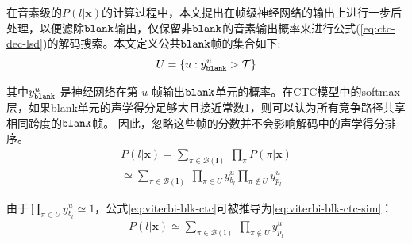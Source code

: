 在音素级的$P(l|\mathbf{x})$的计算过程中，本文提出在帧级神经网络的输出上进行一步后处理，以便滤除$\tt blank$输出，仅保留非$\tt blank$的音素输出概率来进行公式(\ref{eq:ctc-dec-lsd})的解码搜索。本文定义公共$\tt blank$帧的集合如下:
  \begin{equation} \label{eq:com-blk-idx}
    U=\{u:y^{u}_{\tt{blank}} > \mathcal{T}\}
    \end{equation}


其中$y^{u}_{\tt{blank}}$ 是神经网络在第 $u$ 帧输出$\tt blank$单元的概率。在CTC模型中的softmax层，如果blank单元的声学得分足够大且接近常数1，则可以认为所有竞争路径共享相同跨度的$\tt blank$帧。 因此，忽略这些帧的分数并不会影响解码中的声学得分排序。
  \begin{equation} \label{eq:viterbi-blk-ctc}
  \begin{split}
      P(l|\mathbf{x})
      =\sum_{\pi\in\mathcal{B}(\mathbf{l})}
          \ \prod_{\pi}P(\pi|\mathbf{x})\\
        \simeq\sum_{\pi\in\mathcal{B}(\mathbf{l})}
         \  \prod_{\pi\in U}{y_{b_l}^u}{\prod_{\pi\not\in U}{y_{p_l}^u}}
        \end{split}
       \end{equation}


由于$\prod_{\pi\in U}{y_{b_l}^u}\simeq 1$，公式\ref{eq:viterbi-blk-ctc}可被推导为\ref{eq:viterbi-blk-ctc-sim}：
  \begin{equation} \label{eq:viterbi-blk-ctc-sim}
  \begin{split}
      P(l|\mathbf{x})
        \simeq\sum_{\pi\in\mathcal{B}(\mathbf{l})}
         \  {\prod_{\pi\not\in U}{y_{p_l}^u}}
        \end{split}
       \end{equation}

